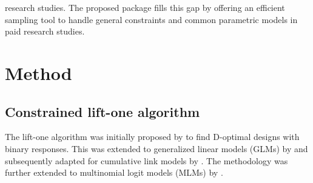 research studies. The proposed  package fills this gap by offering an efficient sampling tool to handle general constraints and common parametric models in paid research studies.

\section{Method}\label{sec:model}
\subsection{Constrained lift-one algorithm}\label{sec:model_algorithm}
The lift-one algorithm was initially proposed by \citet{ymm2016} to find D-optimal designs with binary responses. This was extended to generalized linear models (GLMs) by \citet{ym2015} and subsequently adapted for cumulative link models by \citet{ytm2016}. The methodology was further extended to multinomial logit models (MLMs) by \citet{bu2020}.

